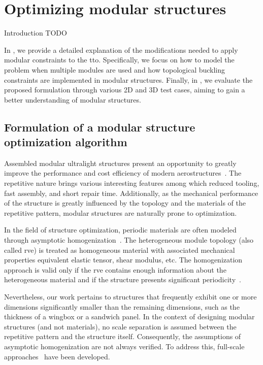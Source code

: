\setchapterpreamble[u]{\margintoc}
\glsresetall %
\chapter{Optimizing modular structures}
Introduction TODO

In , we provide a detailed explanation of the modifications needed to apply modular constraints to the \gls{tto}. Specifically, we focus on how to model the problem when multiple modules are used and how topological buckling constraints are implemented in modular structures. Finally, in , we evaluate the proposed formulation through various 2D and 3D test cases, aiming to gain a better understanding of modular structures.
\section{Formulation of a modular structure optimization algorithm} \label{sec:05_01}
Assembled modular ultralight structures present an opportunity to greatly improve the performance and cost efficiency of modern aerostructures~. The repetitive nature brings various interesting features among which reduced tooling, fast assembly, and short repair time. Additionally, as the mechanical performance of the structure is greatly influenced by the topology and the materials of the repetitive pattern, modular structures are naturally prone to optimization.

In the field of structure optimization, periodic materials are often modeled through asymptotic homogenization~. The heterogeneous module topology (also called \gls{rve}) is treated as homogeneous material with associated mechanical properties \ie equivalent elastic tensor, shear modulus, etc. The homogenization approach is valid only if the \gls{rve} contains enough information about the heterogeneous material and if the structure presents significant periodicity~. 

Nevertheless, our work pertains to structures that frequently exhibit one or more dimensions significantly smaller than the remaining dimensions, such as the thickness of a wingbox or a sandwich panel. In the context of designing modular structures (and not materials), no scale separation is assumed between the repetitive pattern and the structure itself. Consequently, the assumptions of asymptotic homogenization are not always verified. To address this, full-scale approaches~ have been developed.

